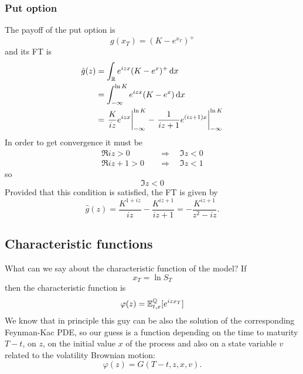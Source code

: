 \subsubsection{Put option}
The payoff of the put option is
\begin{equation}
    g(x_T) = (K-e^{x_T})^+
\end{equation}
and its FT is
\begin{align}
    \notag\hat{g}(z) &= \int_{\mathbb{R}} e^{izx} (K-e^x)^+\,\dd x \\
    &=
    \notag \int_{-\infty}^{\ln K} e^{izx}(K-e^{x})\,\dd x \\
    &=
    \eval{\frac{K}{iz}e^{izx}}^{\ln K}_{-\infty} - \eval{\frac{1}{iz+1}e^{(iz+1)x}}_{-\infty}^{\ln K}
\end{align}
In order to get convergence it must be
\begin{align*}
    \Re{iz} > 0 &\quad\Rightarrow\quad \Im{z} < 0 \\
    \Re{iz+1} > 0 &\quad\Rightarrow\quad \Im{z} < 1
\end{align*}
so
\begin{equation}
    \Im{z} < 0
\end{equation}
Provided that this condition is satisfied, the FT is given by
\begin{equation}
    \hat{g}(z) = \frac{K^{1+iz}}{iz} - \frac{K^{iz+1}}{iz+1} = -\frac{K^{iz+1}}{z^2-iz}.
\end{equation}

\subsection{Characteristic functions}
What can we say about the characteristic function of the model? If
\begin{equation*}
    x_T = \ln S_T
\end{equation*}
then the characteristic function is
\begin{equation*}
    \varphi(z) = \mathbb{E}^{\mathbb{Q}}_{t,x}[e^{izx_T}]
\end{equation*}
We know that in principle this guy can be also the solution of the corresponding Feynman-Kac PDE, so our guess is a function depending on the time to maturity $T-t$, on $z$, on the initial value $x$ of the process and also on a state variable $v$ related to the volatility Brownian motion:
\begin{equation*}
    \varphi(z) = G(T-t,z,x,v).
\end{equation*}
